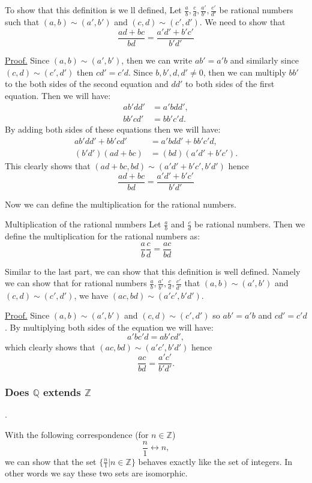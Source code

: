 To show that this definition is we ll defined, Let $ \frac{a}{b},\frac{c}{d},\frac{a'}{b'},\frac{c'}{d'} $ be rational numbers such that $ (a,b) \sim (a',b') $ and $ (c,d) \sim (c', d') $. We need to show that
 \[ \frac{ad+bc}{bd} = \frac{a'd' + b'c'}{b'd'} \]
 
\underline{Proof.} Since $ (a,b) \sim (a',b') $, then we can write $ ab' = a'b $ and similarly since $ (c,d) \sim (c',d') $ then $ cd' = c'd $. Since $ b,b',d,d' \neq 0 $, then we can multiply $ bb' $ to the both sides of the second equation and $ dd' $ to both sides of the first equation. Then we will have:
\begin{align*}
	ab'dd' &= a'bdd', \\
	bb'cd' &= bb'c'd.
\end{align*}
By adding both sides of these equations then we will have: 
\begin{align*}
	ab'dd' + bb'cd' &= a'bdd' + bb'c'd, \\
	(b'd')(ad+bc) &= (bd)(a'd' + b'c').
\end{align*}
This clearly shows that $ (ad+bc, bd) \sim (a'd'+b'c', b'd') $ hence \[\frac{ad+bc}{bd} = \frac{a'd' + b'c'}{b'd'} \]


Now we can define the multiplication for the rational numbers.
\begin{defbox}{Multiplication of the rational numbers}
	Let $ \frac{a}{b} $ and $ \frac{c}{d} $ be rational numbers. Then we define the multiplication for the rational numbers as:
	\[ \frac{a}{b} \frac{c}{d} = \frac{ac}{bd} \]
\end{defbox}

Similar to the last part, we can show that this definition is well defined. Namely we can show that for rational numbers $ \frac{a}{b},\frac{a'}{b'},\frac{c}{d},\frac{c'}{d'} $ that $ (a,b) \sim (a',b') $ and $ (c,d) \sim (c',d') $, we have $ (ac,bd) \sim (a'c', b'd') $.

\underline{Proof.} Since $ (a,b) \sim (a',b') $ and $ (c,d) \sim (c',d') $ so $ ab' = a'b $ and $ cd' = c'd $. By multiplying both sides of the equation we will have:
\[ a'bc'd = ab'cd', \] 
which clearly shows that  $ (ac,bd) \sim (a'c', b'd') $ hence
\[ \frac{ac}{bd} =  \frac{a'c'}{b'd'}. \]


\subsubsection{Does $ \mathbb{Q} $ extends $ \mathbb{Z} $}.

With the following correspondence (for $ n \in \mathbb{Z} $)
\[ \frac{n}{1} \leftrightarrow n, \]
we can show that the set $ \{ \frac{n}{1} | n\in \mathbb{Z} \} $ behaves exactly like the set of integers. In other words we say these two sets are isomorphic.

